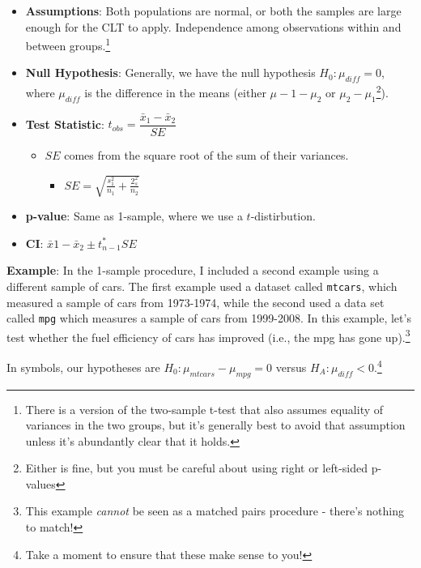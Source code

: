 \documentclass[
  letterpaper,
  DIV=11,
  numbers=noendperiod,
  oneside]{scrreprt}
\providecommand{\tightlist}{%
  \setlength{\itemsep}{0pt}\setlength{\parskip}{0pt}}\usepackage{longtable,booktabs,array}
\begin{document}
\begin{itemize}
\tightlist
\item
  \textbf{Assumptions}: Both populations are normal, or both the samples
  are large enough for the CLT to apply. Independence among observations
  within and between groups.\footnote{There is a version of the
    two-sample t-test that also assumes equality of variances in the two
    groups, but it's generally best to avoid that assumption unless it's
    abundantly clear that it holds.}
\item
  \textbf{Null Hypothesis}: Generally, we have the null hypothesis
  \(H_0:\mu_{diff} = 0\), where \(\mu_{diff}\) is the difference in the
  means (either \(\mu-1 - \mu_2\) or \(\mu_2 - \mu_1\)\footnote{Either
    is fine, but you must be careful about using right or left-sided
    p-values}).
\item
  \textbf{Test Statistic}: \(t_{obs} = \dfrac{\bar x_1 - \bar x_2}{SE}\)

  \begin{itemize}
  \tightlist
  \item
    \(SE\) comes from the square root of the sum of their variances.

    \begin{itemize}
    \tightlist
    \item
      \(SE = \sqrt{\frac{s_1^2}{n_1} + \frac{2_s^2}{n_2}}\)
    \end{itemize}
  \end{itemize}
\item
  \textbf{p-value}: Same as 1-sample, where we use a \(t\)-distirbution.
\item
  \textbf{CI}: \(\bar x1 - \bar x_2 \pm t_{n-1}^*SE\)
\end{itemize}

\textbf{Example}: In the 1-sample procedure, I included a second example
using a different sample of cars. The first example used a dataset
called \texttt{mtcars}, which measured a sample of cars from 1973-1974,
while the second used a data set called \texttt{mpg} which measures a
sample of cars from 1999-2008. In this example, let's test whether the
fuel efficiency of cars has improved (i.e., the mpg has gone
up).\footnote{This example \emph{cannot} be seen as a matched pairs
  procedure - there's nothing to match!}

In symbols, our hypotheses are \(H_0:\mu_{mtcars} - \mu_{mpg} = 0\)
versus \(H_A: \mu_{diff} < 0\).\footnote{Take a moment to ensure that
  these make sense to you!}
\end{document}
